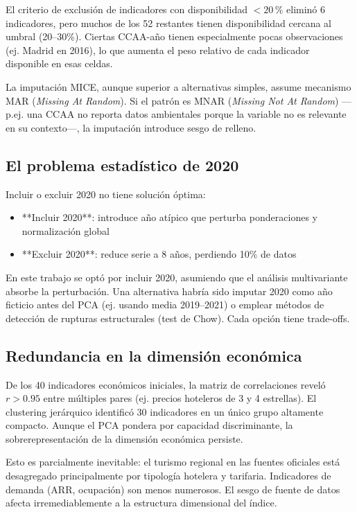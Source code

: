 El criterio de exclusión de indicadores con disponibilidad $< 20\,\%$ eliminó 6 indicadores, pero muchos de los 52 restantes tienen disponibilidad cercana al umbral (20--30\%). Ciertas CCAA-año tienen especialmente pocas observaciones (ej. Madrid en 2016), lo que aumenta el peso relativo de cada indicador disponible en esas celdas.

La imputación MICE, aunque superior a alternativas simples, assume mecanismo MAR (\emph{Missing At Random}). Si el patrón es MNAR (\emph{Missing Not At Random}) —p.ej. una CCAA no reporta datos ambientales porque la variable no es relevante en su contexto—, la imputación introduce sesgo de relleno.

\subsection{El problema estadístico de 2020}

Incluir o excluir 2020 no tiene solución óptima:
\begin{itemize}
    \item **Incluir 2020**: introduce año atípico que perturba ponderaciones y normalización global
    \item **Excluir 2020**: reduce serie a 8 años, perdiendo 10\% de datos
\end{itemize}

En este trabajo se optó por incluir 2020, asumiendo que el análisis multivariante absorbe la perturbación. Una alternativa habría sido imputar 2020 como año ficticio antes del PCA (ej. usando media 2019--2021) o emplear métodos de detección de rupturas estructurales (test de Chow). Cada opción tiene trade-offs.

\subsection{Redundancia en la dimensión económica}

De los 40 indicadores económicos iniciales, la matriz de correlaciones reveló $r > 0.95$ entre múltiples pares (ej. precios hoteleros de 3 y 4 estrellas). El clustering jerárquico identificó 30 indicadores en un único grupo altamente compacto. Aunque el PCA pondera por capacidad discriminante, la sobrerepresentación de la dimensión económica persiste.

Esto es parcialmente inevitable: el turismo regional en las fuentes oficiales está desagregado principalmente por tipología hotelera y tarifaria. Indicadores de demanda (ARR, ocupación) son menos numerosos. El sesgo de fuente de datos afecta irremediablemente a la estructura dimensional del índice.

